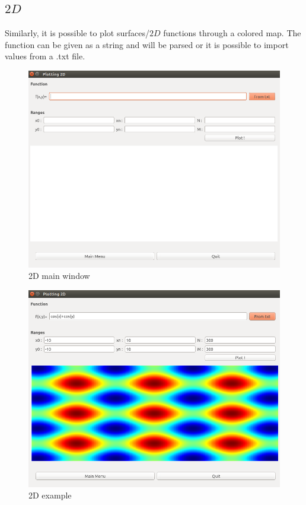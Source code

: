 \documentclass[a4paper]{report}
\begin{document}
\subsection{$2D$}
Similarly, it is possible to plot surfaces/$2D$ functions through a colored map. The function can be given as a string and will be parsed or it is possible to import values from a .txt file.
\begin{figure}[H]
\begin{center}
\includegraphics[scale=0.45]{plotting_2D_nude.png}\caption{2D main window}
\end{center}
\end{figure}


\begin{figure}[H]
\begin{center}
\includegraphics[scale=0.45]{plotting_2D_example.png}\caption{2D example}
\end{center}
\end{figure}
\end{document}

